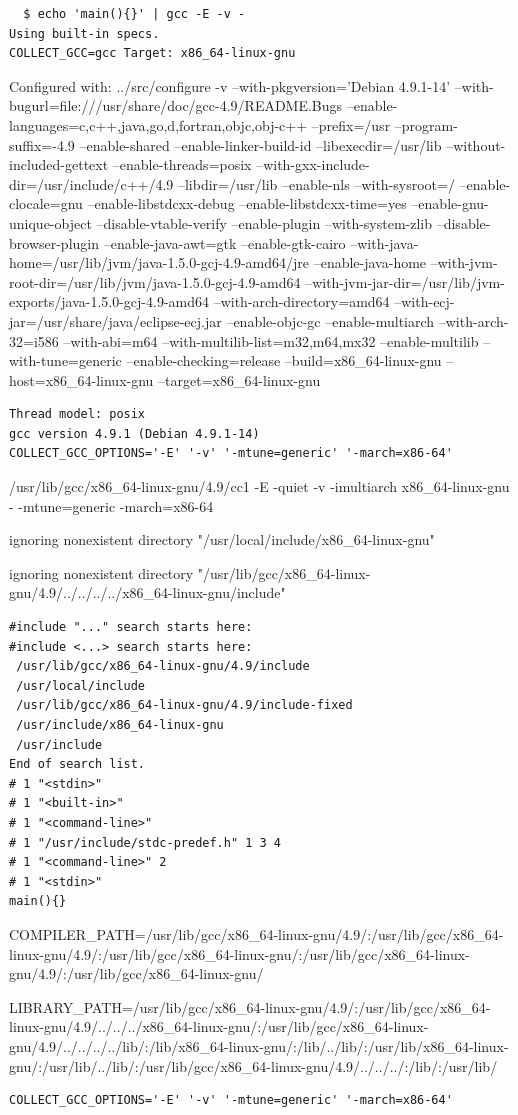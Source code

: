   {\scriptsize
  \begin{verbatim}
  $ echo 'main(){}' | gcc -E -v -
Using built-in specs.
COLLECT_GCC=gcc Target: x86_64-linux-gnu
  \end{verbatim}
  \parbox{\textwidth}
{Configured with: ../src/configure -v --with-pkgversion='Debian 4.9.1-14' --with-bugurl=file:///usr/share/doc/gcc-4.9/README.Bugs --enable-languages=c,c++,java,go,d,fortran,objc,obj-c++ --prefix=/usr --program-suffix=-4.9 --enable-shared --enable-linker-build-id --libexecdir=/usr/lib --without-included-gettext --enable-threads=posix --with-gxx-include-dir=/usr/include/c++/4.9 --libdir=/usr/lib --enable-nls --with-sysroot=/ --enable-clocale=gnu --enable-libstdcxx-debug --enable-libstdcxx-time=yes --enable-gnu-unique-object --disable-vtable-verify --enable-plugin --with-system-zlib --disable-browser-plugin --enable-java-awt=gtk --enable-gtk-cairo --with-java-home=/usr/lib/jvm/java-1.5.0-gcj-4.9-amd64/jre --enable-java-home --with-jvm-root-dir=/usr/lib/jvm/java-1.5.0-gcj-4.9-amd64 --with-jvm-jar-dir=/usr/lib/jvm-exports/java-1.5.0-gcj-4.9-amd64 --with-arch-directory=amd64 --with-ecj-jar=/usr/share/java/eclipse-ecj.jar --enable-objc-gc --enable-multiarch --with-arch-32=i586 --with-abi=m64 --with-multilib-list=m32,m64,mx32 --enable-multilib --with-tune=generic --enable-checking=release --build=x86\_64-linux-gnu --host=x86\_64-linux-gnu --target=x86\_64-linux-gnu}
  \begin{verbatim}
Thread model: posix
gcc version 4.9.1 (Debian 4.9.1-14) 
COLLECT_GCC_OPTIONS='-E' '-v' '-mtune=generic' '-march=x86-64'
  \end{verbatim}
\parbox{\textwidth}{/usr/lib/gcc/x86\_64-linux-gnu/4.9/cc1 -E -quiet -v -imultiarch x86\_64-linux-gnu - -mtune=generic -march=x86-64}
\parbox{\textwidth}{ignoring nonexistent directory "/usr/local/include/x86\_64-linux-gnu"}
\parbox{\textwidth}{ignoring nonexistent directory "/usr/lib/gcc/x86\_64-linux-gnu/4.9/../../../../x86\_64-linux-gnu/include"}
  \begin{verbatim}
#include "..." search starts here:
#include <...> search starts here:
 /usr/lib/gcc/x86_64-linux-gnu/4.9/include
 /usr/local/include
 /usr/lib/gcc/x86_64-linux-gnu/4.9/include-fixed
 /usr/include/x86_64-linux-gnu
 /usr/include
End of search list.
# 1 "<stdin>"
# 1 "<built-in>"
# 1 "<command-line>"
# 1 "/usr/include/stdc-predef.h" 1 3 4
# 1 "<command-line>" 2
# 1 "<stdin>"
main(){}
  \end{verbatim}
\parbox{\textwidth}{COMPILER\_PATH=/usr/lib/gcc/x86\_64-linux-gnu/4.9/:/usr/lib/gcc/x86\_64-linux-gnu/4.9/:/usr/lib/gcc/x86\_64-linux-gnu/:/usr/lib/gcc/x86\_64-linux-gnu/4.9/:/usr/lib/gcc/x86\_64-linux-gnu/}
\parbox{\textwidth}{LIBRARY\_PATH=/usr/lib/gcc/x86\_64-linux-gnu/4.9/:/usr/lib/gcc/x86\_64-linux-gnu/4.9/../../../x86\_64-linux-gnu/:/usr/lib/gcc/x86\_64-linux-gnu/4.9/../../../../lib/:/lib/x86\_64-linux-gnu/:/lib/../lib/:/usr/lib/x86\_64-linux-gnu/:/usr/lib/../lib/:/usr/lib/gcc/x86\_64-linux-gnu/4.9/../../../:/lib/:/usr/lib/}
  \begin{verbatim}
COLLECT_GCC_OPTIONS='-E' '-v' '-mtune=generic' '-march=x86-64'
  \end{verbatim}}
